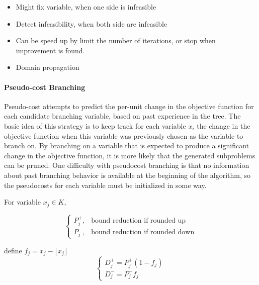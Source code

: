                     \begin{itemize}
                        \item Might fix variable, when one side is infeasible
                        \item Detect infeasibility, when both side are infeasible
                        \item Can be speed up by limit the number of iterations, or stop when improvement is found.
                        \item Domain propagation
                    \end{itemize}

                \paragraph{Pseudo-cost Branching}               
                    
                    Pseudo-cost attempts to predict the per-unit change in the objective function for each candidate branching variable, based on past experience in the tree. The basic idea of this strategy is to keep track for each variable $x_i$ the change in the objective function when this variable was previously chosen as the variable to branch on. By branching on a variable that is expected to produce a significant change in the objective function, it is more likely that the generated subproblems can be pruned. One difficulty with pseudocost branching is that no information about past branching behavior is available at the beginning of the algorithm, so the pseudocosts for each variable must be initialized in some way.

                    For variable $x_j\in K$, 
                    
                    \begin{equation*}\begin{cases}P_j^+, & \text{bound reduction if rounded up} \\ P_j^-, & \text{bound reduction if rounded down}\end{cases}\end{equation*}

                    define $f_j = x_j -\lfloor x_j \rfloor$
                    \begin{equation*}\begin{cases}D_j^+ = P_j^+ (1-f_j) \\ D_j^- = P_j^- f_j\end{cases}\end{equation*}

